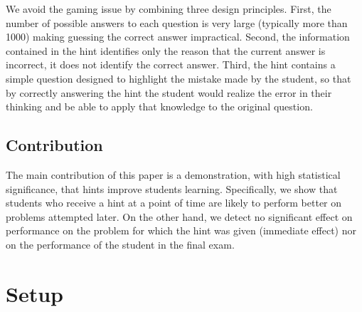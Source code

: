 \documentclass{llncs2e/llncs}
\begin{document}
We avoid the gaming issue by combining three design principles.
First, the number of possible answers to each question is very large (typically more than 1000) making guessing the correct answer impractical.  Second, the information contained in the hint
identifies only the reason that the current answer is incorrect, it
does not identify the correct answer. Third, the hint contains a
simple question designed to highlight the mistake made by the student, so that by correctly answering the hint the student would realize the error in their thinking and be able to apply that knowledge to the original question.

\subsection*{Contribution}

The main contribution of this paper is a demonstration, with high
statistical significance, that hints improve students
learning. Specifically, we show that students who receive a hint at a
point of time are likely to perform better on problems attempted
later. On the other hand, we detect no significant effect on
performance on the problem for which the hint was given (immediate
effect) nor on the performance of the student in the final exam.

\section*{Setup}
\end{document}
